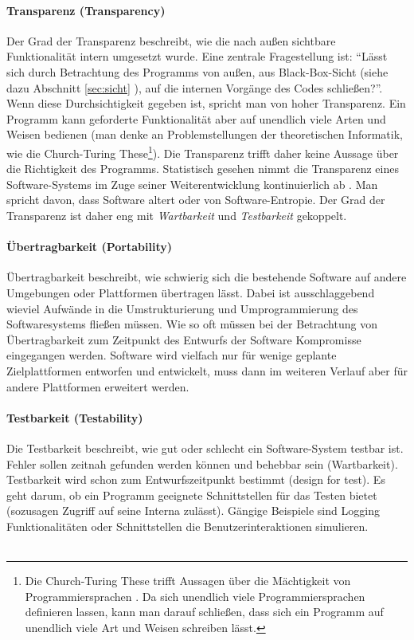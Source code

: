 \paragraph{Transparenz (Transparency)} Der Grad der Transparenz beschreibt, wie die nach außen sichtbare Funktionalität intern umgesetzt wurde. Eine zentrale Fragestellung ist: ``Lässt sich durch Betrachtung des Programms von außen, aus Black-Box-Sicht (siehe dazu Abschnitt \ref{sec:sicht} ), auf die internen Vorgänge des Codes schließen?''. Wenn diese Durchsichtigkeit gegeben ist, spricht man von hoher Transparenz. Ein Programm kann geforderte Funktionalität aber auf unendlich viele Arten und Weisen bedienen (man denke an Problemstellungen der theoretischen Informatik, wie die Church-Turing These\footnote{Die Church-Turing These trifft Aussagen über die Mächtigkeit von Programmiersprachen \cite{hoffmann_theoretische_2011}. Da sich unendlich viele Programmiersprachen definieren lassen, kann man darauf schließen, dass sich ein Programm auf unendlich viele Art und Weisen schreiben lässt.}). Die Transparenz trifft daher keine Aussage über die Richtigkeit des Programms. Statistisch gesehen nimmt die Transparenz eines Software-Systems im Zuge seiner Weiterentwicklung kontinuierlich ab \cite{hoffmann_software-qualitat_2013}. Man spricht davon, dass Software altert oder von Software-Entropie. Der Grad der Transparenz ist daher eng mit \textit{Wartbarkeit} und \textit{Testbarkeit} gekoppelt. 

\paragraph{Übertragbarkeit (Portability)} Übertragbarkeit beschreibt, wie schwierig sich die bestehende Software auf andere Umgebungen oder Plattformen übertragen lässt. Dabei ist ausschlaggebend wieviel Aufwände in die Umstrukturierung und Umprogrammierung des Softwaresystems fließen müssen. Wie so oft müssen bei der Betrachtung von Übertragbarkeit zum Zeitpunkt des Entwurfs der Software Kompromisse eingegangen werden. Software wird vielfach nur für wenige geplante Zielplattformen entworfen und entwickelt, muss dann im weiteren Verlauf aber für andere Plattformen erweitert werden.

\paragraph{Testbarkeit (Testability)} Die Testbarkeit beschreibt, wie gut oder schlecht ein Software-System testbar ist. Fehler sollen zeitnah gefunden werden können und behebbar sein (Wartbarkeit). Testbarkeit wird schon zum Entwurfszeitpunkt bestimmt (design for test). Es geht darum, ob ein Programm geeignete Schnittstellen für das Testen bietet (sozusagen Zugriff auf seine Interna zulässt). Gängige Beispiele sind Logging Funktionalitäten oder Schnittstellen die Benutzerinteraktionen simulieren.
\\\\

